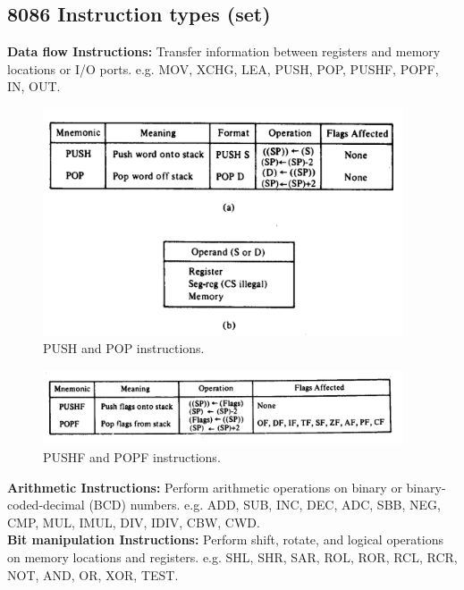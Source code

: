\documentclass[12pt, a4paper]{scrartcl}
\begin{document}
	\subsection{8086 Instruction types (set)}
	\textbf{Data flow Instructions: }Transfer information between registers and memory locations or I/O ports. e.g. MOV, XCHG, LEA, PUSH, POP, PUSHF, POPF, IN, OUT.\\
	\begin{figure}[h]
		\centering
		\includegraphics[width=0.95\textwidth]{images/pushpop.png}
		\caption{PUSH and POP instructions.}
		\label{image-9}
	\end{figure}
	\begin{figure}[h]
		\centering
		\includegraphics[width=0.95\textwidth]{images/pushfpopf.png}
		\caption{PUSHF and POPF instructions.}
		\label{image-10}
	\end{figure}

	\textbf{Arithmetic Instructions: }Perform arithmetic operations on binary or binary-coded-decimal (BCD) numbers. e.g. ADD, SUB, INC, DEC, ADC, SBB, NEG, CMP, MUL, IMUL, DIV, IDIV, CBW, CWD.\\

	\textbf{Bit manipulation Instructions: }Perform shift, rotate, and logical operations on memory locations and registers. e.g. SHL, SHR, SAR, ROL, ROR, RCL, RCR, NOT, AND, OR, XOR, TEST.\\
\end{document}
